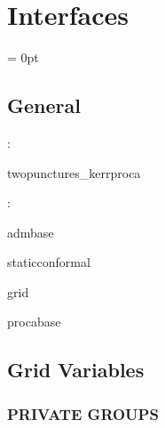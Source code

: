 
\section{Interfaces} 


\parskip = 0pt

\vspace{3mm} \subsection*{General}

: 

twopunctures\_kerrproca
\vspace{2mm}

: 

admbase

staticconformal

grid

procabase
\vspace{2mm}
\subsection*{Grid Variables}
\vspace{5mm}\subsubsection{PRIVATE GROUPS}

\vspace{5mm}

